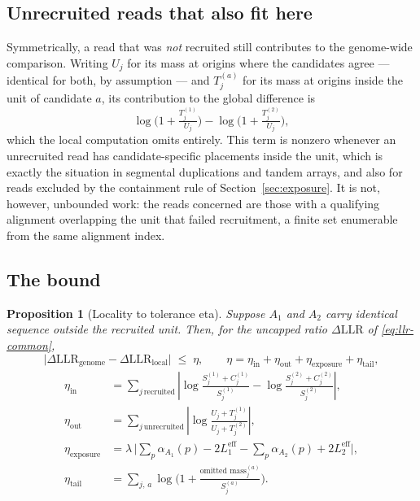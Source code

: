 \documentclass[11pt]{article}
\newtheorem{proposition}{Proposition}
\begin{document}
\subsection{Unrecruited reads that also fit here}

Symmetrically, a read that was \emph{not} recruited still contributes to the
genome-wide comparison.  Writing $U_j$ for its mass at origins where the
candidates agree --- identical for both, by assumption --- and $T^{(a)}_j$ for
its mass at origins inside the unit of candidate $a$, its contribution to the
global difference is
\begin{equation}
    \log\!\Big(1+\tfrac{T^{(1)}_j}{U_j}\Big)
    - \log\!\Big(1+\tfrac{T^{(2)}_j}{U_j}\Big),
\label{eq:unrecruited-discrepancy}
\end{equation}
which the local computation omits entirely.  This term is nonzero whenever an
unrecruited read has candidate-specific placements inside the unit, which is
exactly the situation in segmental duplications and tandem arrays, and also for
reads excluded by the containment rule of Section~\ref{sec:exposure}.  It is
not, however, unbounded work: the reads concerned are those with a qualifying
alignment overlapping the unit that failed recruitment, a finite set
enumerable from the same alignment index.

\subsection{The bound}

\begin{proposition}[Locality to tolerance eta]
\label{prop:locality}
Suppose $A_1$ and $A_2$ carry identical sequence outside the recruited unit.
Then, for the \emph{uncapped} ratio $\Delta\mathrm{LLR}$ of
\eqref{eq:llr-common},
\begin{equation}
    \big|\Delta\mathrm{LLR}_{\text{genome}}
      - \Delta\mathrm{LLR}_{\text{local}}\big| \;\le\; \eta,
    \qquad
    \eta = \eta_{\text{in}} + \eta_{\text{out}}
           + \eta_{\text{exposure}} + \eta_{\text{tail}},
\end{equation}
\begin{align}
    \eta_{\text{in}} &= \sum_{j\,\text{recruited}}
      \left|\log\frac{S^{(1)}_j+C^{(1)}_j}{S^{(1)}_j}
          - \log\frac{S^{(2)}_j+C^{(2)}_j}{S^{(2)}_j}\right|, \\
    \eta_{\text{out}} &= \sum_{j\,\text{unrecruited}}
      \left|\log\frac{U_j+T^{(1)}_j}{U_j+T^{(2)}_j}\right|, \\
    \eta_{\text{exposure}} &= \lambda\,\Big|
        \textstyle\sum_p \alpha_{A_1}(p) - 2L_1^{\mathrm{eff}}
      - \sum_p \alpha_{A_2}(p) + 2L_2^{\mathrm{eff}}\Big| , \\
    \eta_{\text{tail}} &= \sum_{j,\,a}
        \log\!\Big(1+\tfrac{\text{omitted mass}^{(a)}_j}{S^{(a)}_j}\Big).
\end{align}
\end{proposition}
\end{document}
